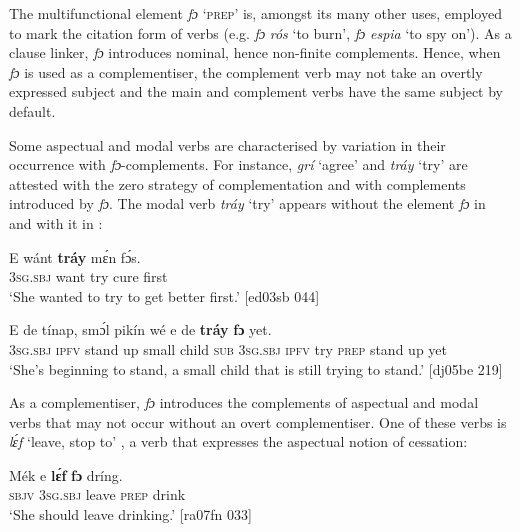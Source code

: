 The multifunctional element \textit{fɔ} ‘\textsc{prep}’ is, amongst its many other uses, employed to mark the citation form of verbs (e.g. \textit{fɔ} \textit{rós} ‘to burn’, \textit{fɔ} \textit{espia} ‘to spy on’). As a clause linker, \textit{fɔ} introduces nominal, hence non-finite complements. Hence, when \textit{fɔ} is used as a complementiser, the complement verb may not take an overtly expressed subject and the main and complement verbs have the same subject by default.


Some aspectual and modal verbs are characterised by variation in their occurrence with \textit{fɔ}{}-complements. For instance, \textit{grí} ‘agree’ and \textit{tráy} ‘try’ are attested with the zero strategy of complementation and with complements introduced by \textit{fɔ}. The modal verb \textit{tráy} ‘try’ appears without the element \textit{fɔ} in  and with it in :



\ea%
    \label{ex:key:1384}
    \gll E    wánt  \textbf{tráy}    mɛ́n    fɔ́s.\\
\textsc{3sg.sbj}  want  try    cure    first\\

\glt ‘She wanted to try to get better first.’ [ed03sb 044]
\z


\ea%
    \label{ex:key:1385}
    \gll E    de  tínap,  smɔ́l  pikín  wé  e    de
\textbf{tráy}    \textbf{fɔ}     yet.\\
\textsc{3sg.sbj}  \textsc{ipfv}  stand up  small  child  \textsc{sub}  \textsc{3sg.sbj}  \textsc{ipfv}
try    \textsc{prep}  stand up    yet\\

\glt ‘She’s beginning to stand, a small child that is still trying
to stand.’ [dj05be 219]
\z

As a complementiser, \textit{fɔ} introduces the complements of aspectual and modal verbs that may not occur without an overt complementiser. One of these verbs is \textit{lɛ́f} ‘leave, stop to’ , a verb that expresses the aspectual notion of cessation: 


\ea%
    \label{ex:key:1386}
    \gll Mék    e    \textbf{lɛ́f}    \textbf{fɔ}  dríng.\\
\textsc{sbjv}    \textsc{3sg.sbj}  leave  \textsc{prep}  drink\\

\glt ‘She should leave drinking.’ [ra07fn 033]
\z

